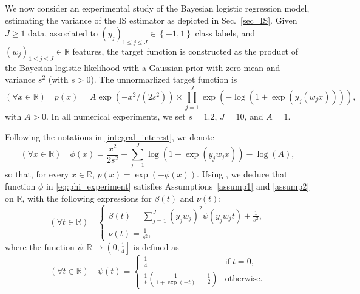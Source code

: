 \documentclass[review]{elsarticle}
\newcommand{\bR}{\mathbb{R}}
\newcommand{\emilie}[1]{\textcolor{magenta}{\textbf{[{\em EMILIE SAYS}: #1]}}}
\begin{document}
We now consider an experimental study of the Bayesian logistic regression model, estimating the variance of the IS estimator as   depicted in Sec.~\ref{sec_IS}. Given $J\geq1$ data, associated to $(y_j)_{1 \leq j \leq J} \in \left\{-1,1\right\}$ class labels, and $(w_j)_{1 \leq j \leq J} \in \mathbb{R}$ features, the target function is constructed as the product of the Bayesian logistic likelihood with a Gaussian prior with zero mean and variance $s^2$ (with $s>0$). The unnormarlized target function is %
\begin{equation}
(\forall x \in \bR) \quad
p(x) = A \exp(-x^2/(2 s^2)) \times \prod_{j=1}^J \exp\left(-\log( 1 + \exp(y_j (w_j x)) )\right),
\label{eq:pi}
\end{equation}
with $A > 0$. In all numerical experiments, we set $s=1.2$, $J=10$, and $A=1$. %



Following the notations in \eqref{integral_interest}, we denote 
\begin{equation}
\label{eq:phi_experiment}
(\forall x \in \mathbb{R}) \quad \phi(x) = \frac{x^2}{2 s^2} + \sum_{j=1}^J \log\left(1 + \exp(y_j w_j x)\right) - \log(A),
\end{equation}
so that, for every $x \in \mathbb{R}$, $p(x) = \exp(-\phi(x))$. Using \cite{Bouchard2008,chouzenoux:hal-03793623}, we deduce that function $\phi$ in \eqref{eq:phi_experiment} satisfies Assumptions~\ref{assump1} and \ref{assump2} on $\mathbb{R}$, with the following expressions for $\beta(t)$ and $\nu(t)$:
\begin{equation}
\label{eq:beta_nu_pi}
(\forall t \in \mathbb{R}) \quad
\begin{cases}                      
\beta(t) = \sum_{j=1}^J (y_j w_j)^2 \psi(y_j w_j t) + \frac{1}{s^2},\\
\nu(t) = \frac{1}{s^2},
\end{cases}
\end{equation}
where the function $\psi: \mathbb{R} \to \left(0, \frac{1}{4}\right]$ is defined as
\begin{equation}
\label{eq:psi_def}
(\forall t \in \mathbb{R}) \quad
\psi(t) = 
\begin{cases}                      
\frac{1}{4} & \text{if} \; t = 0,\\
\frac{1}{t} \left(\frac{1}{1 + \exp(-t)} - \frac{1}{2}\right) & \text{otherwise.}
\end{cases}
\end{equation}
\end{document}
